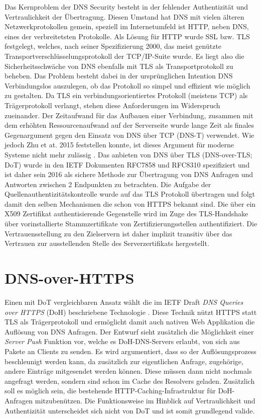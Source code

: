 Das Kernproblem der DNS Security besteht in der fehlender Authentizität und Vertraulichkeit der Übertragung. Diesen Umstand hat DNS mit vielen älteren Netzwerkprotokollen gemein, speziell im Internetumfeld ist HTTP, neben DNS, eines der verbreitetsten Protokolle. Als Lösung für HTTP wurde SSL bzw. TLS festgelegt, welches, nach seiner Spezifizierung 2000, das meist genützte Transportverschlüsselungsprotokoll der TCP/IP-Suite wurde. Es liegt also die Sicherheitsschwäche von DNS ebenfalls mit TLS als Transportprotokoll zu beheben. Das Problem besteht dabei in der ursprünglichen Intention DNS Verbindungslos auszulegen, ob das Protokoll so simpel und effizient wie möglich zu gestalten. Da TLS ein verbindungsorientiertes Protokoll (meistens TCP) als Trägerprotokoll verlangt, stehen diese Anforderungen im Widerspruch zueinander. Der Zeitaufwand für das Aufbauen einer Verbindung, zusammen mit dem erhöhten Ressourcenaufwand auf der Serverseite wurde lange Zeit als finales Gegenargument gegen den Einsatz von DNS über TCP (DNS-T) verwendet. Wie jedoch Zhu et at. 2015 feststellen konnte, ist dieses Argument für moderne Systeme nicht mehr zulässig \cite{Zhu2015}. Das anbieten von DNS über TLS (DNS-over-TLS; DoT) wurde in den IETF Dokumenten RFC7858\cite{Hu2016} und RFC8310\cite{Dickinson2018} spezifiziert und ist daher sein 2016 als sichere Methode zur Übertragung von DNS Anfragen und Antworten zwischen 2 Endpunkten zu betrachten. Die Aufgabe der Quellenauthentizitätskontrolle wurde auf das TLS Protokoll übertragen und folgt damit den selben Mechanismen die schon von HTTPS bekannt sind. Die über ein X509 Zertifikat authentisierende Gegenstelle wird im Zuge des TLS-Handshake über vorinstallierte Stammzertifikate von Zertifizierungsstellen authentifiziert. Die Vertrauensstellung zu den Zielservern ist daher implizit transitiv über das Vertrauen zur ausstellenden Stelle des Serverzertifikats hergestellt.        

\section{DNS-over-HTTPS}

Einen mit DoT vergleichbaren Ansatz wählt die im IETF Draft \textit{DNS Queries over HTTPS} (DoH) beschriebene Technologie \cite{Mcmanus2018}. Diese Technik nützt HTTPS statt TLS als Trägerprotokoll und ermöglicht damit auch nativen Web Applikation die Auflösung von DNS Anfragen. Der Entwurf sieht zusätzlich die Möglichkeit einer \textit{Server Push} Funktion vor, welche es DoH-DNS-Servers erlaubt, von sich aus Pakete an Clients zu senden. Es wird argumentiert, dass so der Auflösungsprozess beschleunigt werden kann, da zusätzlich zur eigentlichen Anfrage, zugehörige, andere Einträge mitgesendet werden können. Diese müssen dann nicht nochmals angefragt werden, sondern sind schon im Cache des Resolvers geladen. Zusätzlich soll es möglich sein, die bestehende HTTP-Caching-Infrastruktur für DoH-Anfragen mitzubenützen. Die Funktionsweise im Hinblick auf Vertraulichkeit und Authentizität unterscheidet sich nicht von DoT und ist somit grundlegend valide.

